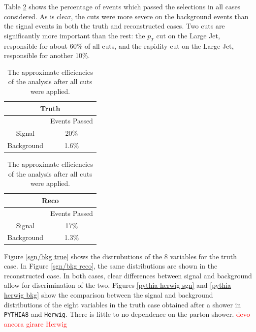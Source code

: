 \documentclass[10pt,a4paper]{book}
\newcommand\todo[1]{\textcolor{red}{#1}}
\def\code#1{\texttt{#1}}
\begin{document}
Table \ref{Efficiencies table} shows the percentage of events which passed the selections in all cases considered. As is clear, the cuts were more severe on the background events than the signal events in both the truth and reconstructed cases. Two cuts are significantly more important than the rest: the $p_T$ cut on the Large Jet, responsible for about 60\% of all cuts, and the rapidity cut on the Large Jet, responsible for another 10\%.

\begin{table}[!htb]
    \begin{minipage}{.5\linewidth}
      \centering
        \begin{tabular}{|c|c|}
		\hline 
		\multicolumn{2}{|c|}{\textbf{Truth}} \\ 
		\hline 
		\* & Events Passed \\ 
		\hline 
		Signal & 20\% \\ 
		\hline 
		Background & 1.6\% \\ 
		\hline 
		\end{tabular}  
    \end{minipage}%
    \begin{minipage}{.5\linewidth}
      \centering
        \begin{tabular}{|c|c|}
		\hline 
		\multicolumn{2}{|c|}{\textbf{Reco}} \\ 
		\hline 
		\* & Events Passed \\ 
		\hline 
		Signal & 17\% \\ 
		\hline 
		Background & 1.3\% \\ 
		\hline 
		\end{tabular} 
    \end{minipage} 
    \caption{The approximate efficiencies of the analysis after all cuts were applied.}
    \label{Efficiencies table}
\end{table}

Figure \ref{sgn/bkg true} shows the distrubutions of the 8 variables for the truth case. In Figure \ref{sgn/bkg reco}, the same distributions are shown in the reconstructed case. In both cases, clear differences between signal and background allow for discrimination of the two. Figures \ref{pythia herwig sgn} and \ref{pythia herwig bkg} show the comparison between the signal and background distributions of the eight variables in the truth case obtained after a shower in \code{PYTHIA8} and \code{Herwig}. There is little to no dependence on the parton shower. \todo{devo ancora girare Herwig}
\end{document}
